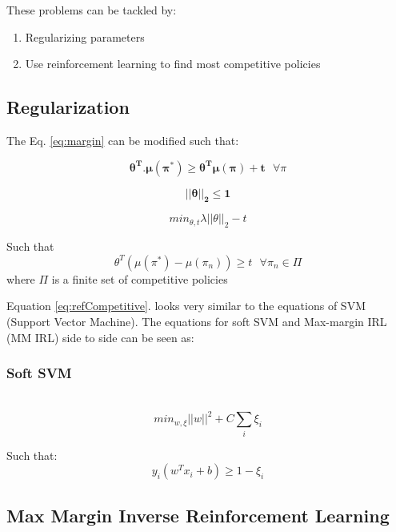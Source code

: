 \documentclass[11pt]{article}
\begin{document}
These problems can be tackled by:
\begin{enumerate}
\item Regularizing parameters
\item Use reinforcement learning to find most competitive policies
\end{enumerate}

\subsection{Regularization}

The Eq. \ref{eq:margin} can be modified such that:

\begin{equation}
\mathbf{\theta^T.\mu(\pi^*)\geq \theta^T\mu(\pi)+t} \texttt{ }\forall \pi
\end{equation}

\begin{equation}
\mathbf{||\theta||_2\leq1}
\end{equation}

\begin{equation}
min_{\theta,t} \lambda||\theta||_2 - t
\end{equation}

Such that\\
\begin{equation}\label{eq:refCompetitive}  
\theta^T(\mu(\pi^*)-\mu(\pi_n))\geq t \texttt{ } \forall \pi_n \in \Pi
\end{equation}
where $\Pi$ is a finite set of competitive policies 

Equation \ref{eq:refCompetitive}. looks very similar to the equations of SVM (Support Vector Machine). The equations for soft SVM and Max-margin IRL (MM IRL) side to side can be seen as:

\subsubsection{Soft SVM}\\
\begin{equation}
min_{w, \xi}||w||^2 + C \sum_i\xi_i
\end{equation}

Such that:
\begin{equation}
y_i(w^Tx_i+b)\geq 1-\xi_i
\end{equation}


\subsection{Max Margin Inverse Reinforcement Learning}
\end{document}
